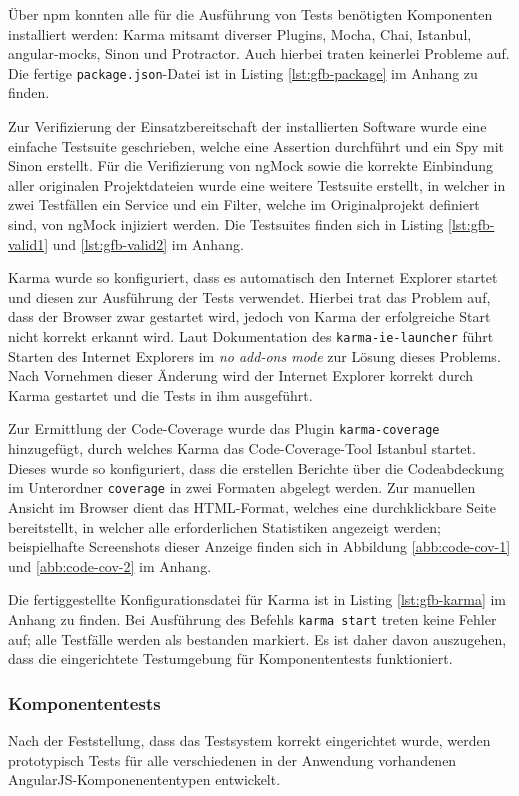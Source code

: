 Über npm konnten alle für die Ausführung von Tests benötigten Komponenten installiert werden: Karma mitsamt diverser Plugins, Mocha, Chai, Istanbul, angular-mocks, Sinon und Protractor. Auch hierbei traten keinerlei Probleme auf. Die fertige \texttt{package.json}-Datei ist in Listing \ref{lst:gfb-package} im Anhang zu finden.

Zur Verifizierung der Einsatzbereitschaft der installierten Software wurde eine einfache Testsuite geschrieben, welche eine Assertion durchführt und ein Spy mit Sinon erstellt. Für die Verifizierung von ngMock sowie die korrekte Einbindung aller originalen Projektdateien wurde eine weitere Testsuite erstellt, in welcher in zwei Testfällen ein Service und ein Filter, welche im Originalprojekt definiert sind, von ngMock injiziert werden. Die Testsuites finden sich in Listing \ref{lst:gfb-valid1} und \ref{lst:gfb-valid2} im Anhang. 

Karma wurde so konfiguriert, dass es automatisch den Internet Explorer startet und diesen zur Ausführung der Tests verwendet. Hierbei trat das Problem auf, dass der Browser zwar gestartet wird, jedoch von Karma der erfolgreiche Start nicht korrekt erkannt wird. Laut Dokumentation des \texttt{karma-ie-launcher} führt Starten des Internet Explorers im \textit{no add-ons mode} zur Lösung dieses Problems\cite{karma-ie-launcher}. Nach Vornehmen dieser Änderung wird der Internet Explorer korrekt durch Karma gestartet und die Tests in ihm ausgeführt.

Zur Ermittlung der Code-Coverage wurde das Plugin \texttt{karma-coverage} hinzugefügt, durch welches Karma das Code-Coverage-Tool Istanbul startet. Dieses wurde so konfiguriert, dass die erstellen Berichte über die Codeabdeckung im Unterordner \texttt{coverage} in zwei Formaten abgelegt werden. Zur manuellen Ansicht im Browser dient das HTML-Format, welches eine durchklickbare Seite bereitstellt, in welcher alle erforderlichen Statistiken angezeigt werden; beispielhafte Screenshots dieser Anzeige finden sich in Abbildung \ref{abb:code-cov-1} und \ref{abb:code-cov-2} im Anhang. 

Die fertiggestellte Konfigurationsdatei für Karma ist in Listing \ref{lst:gfb-karma} im Anhang zu finden. Bei Ausführung des Befehls \texttt{karma start} treten keine Fehler auf; alle Testfälle werden als bestanden markiert. Es ist daher davon auszugehen, dass die eingerichtete Testumgebung für Komponententests funktioniert. 	

\subsubsection{Komponententests}
Nach der Feststellung, dass das Testsystem korrekt eingerichtet wurde, werden prototypisch Tests für alle verschiedenen in der Anwendung vorhandenen AngularJS-Komponenententypen entwickelt.

